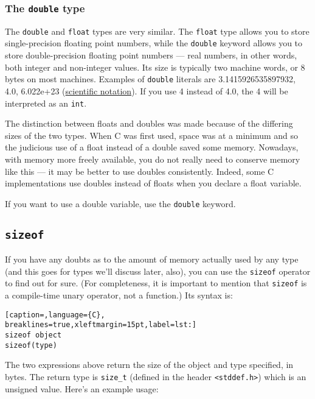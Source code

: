 \subsubsection{The \texttt{double} type}
The \texttt{double} and \texttt{float} types are very similar. The
\texttt{float} type allows you to store single-precision floating point
numbers, while the \texttt{double} keyword allows you to store double-precision
floating point numbers --- real numbers, in other words, both integer and
non-integer values. Its size is typically two machine words, or 8 bytes on most
machines. Examples of \texttt{double} literals are 3.1415926535897932, 4.0,
6.022e+23 (\href{http://en.wikipedia.org/wiki/Scientific\_notation}{scientific
notation}). If you use 4 instead of 4.0, the 4 will be interpreted as an
\texttt{int}.

The distinction between floats and doubles was made because of the differing
sizes of the two types. When C was first used, space was at a minimum and so
the judicious use of a float instead of a double saved some memory. Nowadays,
with memory more freely available, you do not really need to conserve memory
like this --- it may be better to use doubles consistently. Indeed, some C
implementations use doubles instead of floats when you declare a float
variable.

If you want to use a double variable, use the \texttt{double} keyword.

\subsection{\texttt{sizeof}}
If you have any doubts as to the amount of memory actually used by any type
(and this goes for types we'll discuss later, also), you can use the
\texttt{sizeof} operator to find out for sure. (For completeness, it is
important to mention that \texttt{sizeof} is a compile-time unary operator, not
a function.) Its syntax is:

\lstset{basicstyle=\scriptsize, numbers=left, captionpos=b, tabsize=4}
\begin{lstlisting}[caption=,language={C},
breaklines=true,xleftmargin=15pt,label=lst:]
sizeof object
sizeof(type)
\end{lstlisting}

The two expressions above return the size of the object and type specified, in
bytes. The return type is \texttt{size\_t} (defined in the header
\texttt{\textless{}stddef.h\textgreater{}}) which is an unsigned value. Here's
an example usage:

